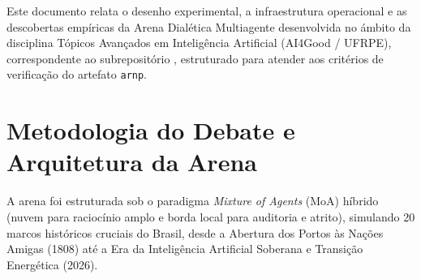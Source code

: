 \documentclass[runningheads]{llncs}
\begin{document}
Este documento relata o desenho experimental, a infraestrutura operacional e as descobertas emp\'{i}ricas da Arena Dial\'{e}tica Multiagente desenvolvida no \'{a}mbito da disciplina T\'{o}picos Avan\c{c}ados em Intelig\^{e}ncia Artificial (AI4Good / UFRPE), correspondente ao subreposit\'{o}rio , estruturado para atender aos crit\'{e}rios de verifica\c{c}\~{a}o do artefato \texttt{arn\textperiodcentered p}.

\section{Metodologia do Debate e Arquitetura da Arena}
A arena foi estruturada sob o paradigma \textit{Mixture of Agents} (MoA) h\'{i}brido (nuvem para racioc\'{i}nio amplo e borda local para auditoria e atrito), simulando 20 marcos hist\'{o}ricos cruciais do Brasil, desde a Abertura dos Portos \`{a}s Na\c{c}\~{o}es Amigas (1808) at\'{e} a Era da Intelig\^{e}ncia Artificial Soberana e Transi\c{c}\~{a}o Energ\'{e}tica (2026).
\end{document}
